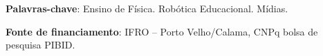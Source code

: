 \documentclass[article,12pt,onesidea,4paper,english,brazil]{abntex2}
\begin{document}
	\vspace{\onelineskip}
	
	\noindent
	\textbf{Palavras-chave}: Ensino de Física. Robótica Educacional. Mídias.
	
	\noindent
    \textbf{Fonte de financiamento}: IFRO – Porto Velho/Calama, CNPq bolsa de pesquisa PIBID.
	
\end{document}

